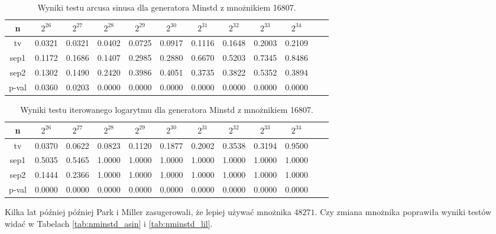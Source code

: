 \documentclass[a4paper,11pt,twoside]{book}
\theoremstyle{definition}
\begin{document}
\begin{table}[ht!]
\centering
 \caption{Wyniki testu arcusa sinusa dla generatora Minstd z mnożnikiem 16807.}
 \label{tab:minstd_asin}
\begin{tabular} {||c|c|c|c|c|c|c|c|c|c|c|c||}  
 \hline
     n &  $2^{26}$ &  $2^{27}$ &  $2^{28}$ &  $2^{29}$ &  $2^{30}$ &  $2^{31}$ &  $2^{32}$ &  $2^{33}$ &  $2^{34}$\\ \hline
     tv &  0.0321 &  0.0321 &  0.0402 &  0.0725 &  0.0917 &  0.1116 &  0.1648 &  0.2003 &  0.2109\\ \hline
   sep1 &  0.1172 &  0.1686 &  0.1407 &  0.2985 &  0.2880 &  0.6670 &  0.5203 &  0.7345 &  0.8486\\ \hline
   sep2 &  0.1302 &  0.1490 &  0.2420 &  0.3986 &  0.4051 &  0.3735 &  0.3822 &  0.5352 &  0.3894\\ \hline
  p-val &  0.0360 &  0.0203 &  0.0000 &  0.0000 &  0.0000 &  0.0000 &  0.0000 &  0.0000 &  0.0000\\ \hline

\end{tabular}  
\end{table}
\begin{table}[ht!]
\centering
 \caption{Wyniki testu iterowanego logarytmu dla generatora Minstd z mnożnikiem 16807.}
 \label{tab:minstd_lil}
\begin{tabular} {||c|c|c|c|c|c|c|c|c|c|c|c||}  
 \hline 
     n &  $2^{26}$ &  $2^{27}$ &  $2^{28}$ &  $2^{29}$ &  $2^{30}$ &  $2^{31}$ &  $2^{32}$ &  $2^{33}$ &  $2^{34}$\\ \hline
     tv &  0.0370 &  0.0622 &  0.0823 &  0.1120 &  0.1877 &  0.2002 &  0.3538 &  0.3194 &  0.9500\\ \hline
   sep1 &  0.5035 &  0.5465 &  1.0000 &  1.0000 &  1.0000 &  1.0000 &  1.0000 &  1.0000 &  1.0000\\ \hline
   sep2 &  0.1444 &  0.2366 &  1.0000 &  1.0000 &  1.0000 &  1.0000 &  1.0000 &  1.0000 &  1.0000\\ \hline
  p-val &  0.0000 &  0.0000 &  0.0000 &  0.0000 &  0.0000 &  0.0000 &  0.0000 &  0.0000 &  0.0000\\ \hline
\end{tabular}  
\end{table}

Kilka lat później później Park i Miller zasugerowali, że lepiej używać mnożnika $48271$. Czy zmiana mnożnika poprawiła wyniki testów widać w Tabelach \ref{tab:nminstd_asin} i \ref{tab:nminstd_lil}.
\end{document}
